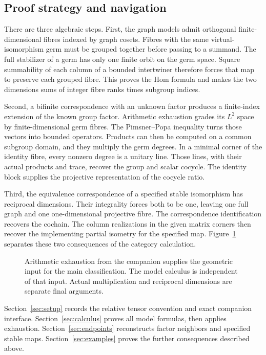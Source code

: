 \subsection{Proof strategy and navigation}

There are three algebraic steps. First, the graph models admit orthogonal
finite-dimensional fibres indexed by graph cosets. Fibres with the same
virtual-isomorphism germ must be grouped together before passing to a
summand. The full stabilizer of a germ has only one finite orbit on the
germ space. Square summability of each column of a bounded intertwiner
therefore forces that map to preserve each grouped fibre. This proves
the Hom formula and makes the two dimensions sums of integer fibre ranks
times subgroup indices.

Second, a bifinite correspondence with an unknown factor produces a
finite-index extension of the known group factor. Arithmetic exhaustion
grades its $L^2$ space by finite-dimensional germ fibres. The
Pimsner--Popa inequality turns those vectors into bounded operators.
Products can then be computed on a common subgroup domain, and they
multiply the germ degrees. In a minimal corner of the identity fibre,
every nonzero degree is a unitary line. Those lines, with their actual
products and trace, recover the group and scalar cocycle. The identity
block supplies the projective representation of the cocycle ratio.

Third, the equivalence correspondence of a specified stable isomorphism
has reciprocal dimensions. Their integrality forces both to be one,
leaving one full graph and one one-dimensional projective fibre. The
correspondence identification recovers the cochain. The column
realizations in the given matrix corners then recover the implementing
partial isometry for the specified map. Figure~\ref{fig:proof-map}
separates these two consequences of the category calculation.

\begin{figure}[htbp]
\centering

\caption{Arithmetic exhaustion from the companion supplies the geometric input
for the main classification. The model calculus is independent of that input. Actual
multiplication and reciprocal dimensions are separate final arguments.}
\label{fig:proof-map}
\end{figure}

Section~\ref{sec:setup} records the relative tensor convention and exact
companion interface. Section~\ref{sec:calculus} proves all model formulas,
then applies exhaustion. Section~\ref{sec:endpoints} reconstructs factor
neighbors and specified stable maps. Section~\ref{sec:examples} proves the further consequences described above.

